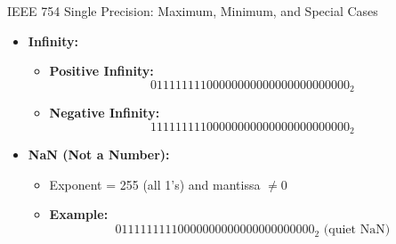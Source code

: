 \documentclass[aspectratio=169]{beamer}
\begin{document}
\begin{frame}[allowframebreaks]{IEEE 754 Single Precision: Maximum, Minimum, and Special Cases}
\begin{itemize}
\begin{itemize}
            \item \textbf{Infinity:}
            \begin{itemize}
                \item \textbf{Positive Infinity:} 
                \[
                01111111100000000000000000000000_2
                \]
                \item \textbf{Negative Infinity:} 
                \[
                11111111100000000000000000000000_2
                \]
            \end{itemize}

            \framebreak

            
            \item \textbf{NaN (Not a Number):}
            \begin{itemize}
                \item Exponent = 255 (all 1's) and mantissa \(\neq 0\)
                \item \textbf{Example:} 
                \[
                01111111110000000000000000000000_2 \text{ (quiet NaN)}
                \]
            \end{itemize}
        \end{itemize}
    \end{itemize}
\end{frame}
\end{document}
